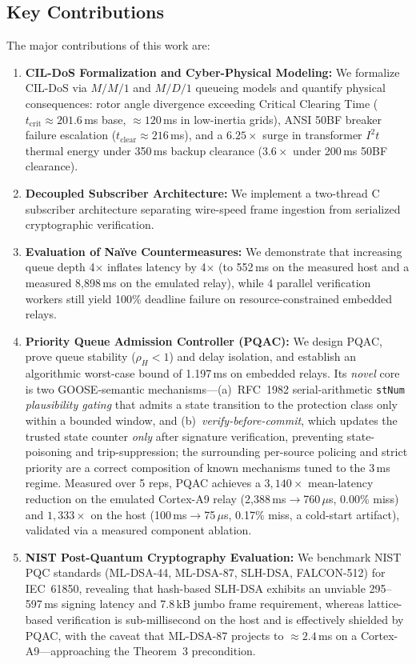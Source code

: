 \documentclass[journal]{IEEEtran}
\begin{document}
\subsection{Key Contributions}
The major contributions of this work are:
\begin{enumerate}[leftmargin=*,noitemsep,topsep=1pt]
    \item \textbf{CIL-DoS Formalization and Cyber-Physical Modeling:} We formalize CIL-DoS via $M/M/1$ and $M/D/1$ queueing models and quantify physical consequences: rotor angle divergence exceeding Critical Clearing Time ($t_{\text{crit}} \approx 201.6$\,ms base, $\approx 120$\,ms in low-inertia grids), ANSI 50BF breaker failure escalation ($t_{\text{clear}} \approx 216$\,ms), and a $6.25\times$ surge in transformer $I^2 t$ thermal energy under 350\,ms backup clearance ($3.6\times$ under 200\,ms 50BF clearance).
    \item \textbf{Decoupled Subscriber Architecture:} We implement a two-thread C subscriber architecture separating wire-speed frame ingestion from serialized cryptographic verification.
    \item \textbf{Evaluation of Na\"ive Countermeasures:} We demonstrate that increasing queue depth 4$\times$ inflates latency by 4$\times$ (to 552\,ms on the measured host and a measured 8,898\,ms on the emulated relay), while 4 parallel verification workers still yield 100\% deadline failure on resource-constrained embedded relays.
    \item \textbf{Priority Queue Admission Controller (PQAC):} We design PQAC, prove queue stability ($\rho_H < 1$) and delay isolation, and establish an algorithmic worst-case bound of 1.197\,ms on embedded relays. Its \emph{novel} core is two GOOSE-semantic mechanisms---(a)~RFC~1982 serial-arithmetic \texttt{stNum} \emph{plausibility gating} that admits a state transition to the protection class only within a bounded window, and (b)~\emph{verify-before-commit}, which updates the trusted state counter \emph{only} after signature verification, preventing state-poisoning and trip-suppression; the surrounding per-source policing and strict priority are a correct composition of known mechanisms tuned to the 3\,ms regime. Measured over 5 reps, PQAC achieves a $3{,}140\times$ mean-latency reduction on the emulated Cortex-A9 relay (2{,}388\,ms$\to$760\,$\mu$s, 0.00\% miss) and $1{,}333\times$ on the host (100\,ms$\to$75\,$\mu$s, 0.17\% miss, a cold-start artifact), validated via a measured component ablation.
    \item \textbf{NIST Post-Quantum Cryptography Evaluation:} We benchmark NIST PQC standards (ML-DSA-44, ML-DSA-87, SLH-DSA, FALCON-512) for IEC~61850, revealing that hash-based SLH-DSA exhibits an unviable 295--597\,ms signing latency and 7.8\,kB jumbo frame requirement, whereas lattice-based verification is sub-millisecond on the host and is effectively shielded by PQAC, with the caveat that ML-DSA-87 projects to $\approx 2.4$\,ms on a Cortex-A9---approaching the Theorem~3 precondition.

\end{enumerate}
\end{document}
